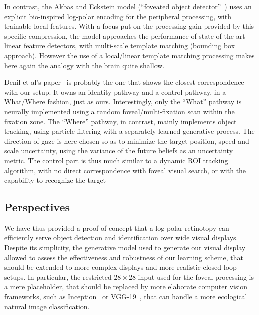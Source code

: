 In contrast, the Akbas and Eckstein model (“foveated object detector”~\cite{akbas2017object}) uses an explicit bio-inspired log-polar encoding
for the peripheral processing, with trainable local features.
With a focus put on the processing gain provided by this specific compression,
the model approaches the performance of state-of-the-art linear feature detectors, with multi-scale template matching (bounding box approach). However the use of
a local/linear template matching processing makes here again the analogy with the brain quite shallow.


Denil et al's paper~\cite{denil2012learning} is probably the one that shows the closest correspondence with our setup. It owns an identity pathway and a control pathway, in a What/Where fashion, just as ours. Interestingly, only the ``What'' pathway is neurally implemented using a random foveal/multi-fixation scan within the fixation zone. The ``Where'' pathway, in contrast, mainly implements object tracking, using particle filtering with a separately learned generative process. The direction of gaze is here chosen so as to minimize the target position, speed and scale uncertainty, using the variance of the future beliefs as an uncertainty metric. The control part is thus much similar to a dynamic ROI tracking algorithm, with no direct correspondence with foveal visual search, or with the capability to recognize the target

\subsection{Perspectives}

We have thus provided a proof of concept that a log-polar retinotopy can efficiently serve object detection and identification over wide visual displays. Despite its simplicity, the generative model used to generate our visual display allowed to assess the effectiveness and robustness of our learning scheme, that should be extended to more complex displays and more realistic closed-loop setups. In particular, the restricted $28\times28$ input used for the foveal processing is a mere placeholder, that should be replaced by more elaborate computer vision frameworks, such as Inception~\cite{szegedy2015going} or VGG-19~\cite{simonyan2014very}, that can handle a more ecological natural image classification.

